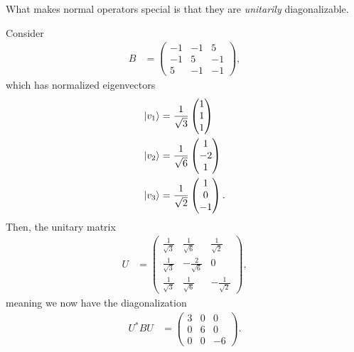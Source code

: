 \documentclass[10pt]{mypackage}
\begin{document}
What makes normal operators special is that they are \textit{unitarily} diagonalizable.
\begin{example}
  \renewcommand{\arraystretch}{1.5}
  Consider
  \begin{align*}
    B &= \begin{pmatrix}-1 & -1 & 5 \\ -1 & 5 & -1 \\ 5 & -1 & -1\end{pmatrix},
  \end{align*}
  which has normalized eigenvectors
  \begin{align*}
    \ket{v_1} &= \frac{1}{\sqrt{3}}\begin{pmatrix}1\\1\\1\end{pmatrix}\\
    \ket{v_2} &= \frac{1}{\sqrt{6}} \begin{pmatrix}1\\-2\\1\end{pmatrix}\\
    \ket{v_3} &= \frac{1}{\sqrt{2}}\begin{pmatrix}1\\0\\-1\end{pmatrix}.
  \end{align*}
  Then, the unitary matrix
  \begin{align*}
    U &= \begin{pmatrix}\frac{1}{\sqrt{3}} & \frac{1}{\sqrt{6}} & \frac{1}{\sqrt{2}}\\\frac{1}{\sqrt{3}} & -\frac{2}{\sqrt{6}} & 0\\ \frac{1}{\sqrt{3}} & \frac{1}{\sqrt{6}} & -\frac{1}{\sqrt{2}}\end{pmatrix},
  \end{align*}
  meaning we now have the diagonalization
  \begin{align*}
    U^{\ast}BU &= \begin{pmatrix}3 & 0 & 0 \\ 0 & 6 & 0 \\ 0 & 0 & -6\end{pmatrix}.
  \end{align*}
\end{example}
\end{document}
